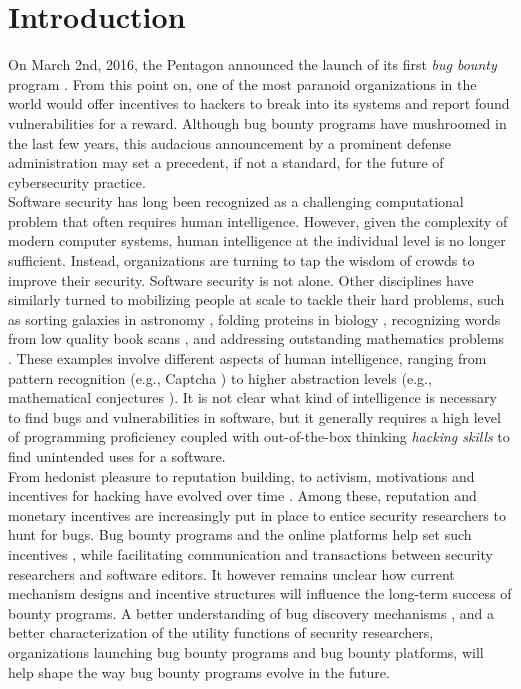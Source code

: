 \section{Introduction}
\label{sec:intro}
On March 2nd, 2016, the Pentagon announced the launch of its first {\it bug bounty} program \cite{Pentagon}. From this point on, one of the most paranoid organizations in the world would offer incentives to hackers to break into its systems and report found vulnerabilities for a reward. Although bug bounty programs have mushroomed in the last few years, this audacious announcement by a prominent defense administration may set a precedent, if not a standard, for the future of cybersecurity practice.\\ 

Software security has long been recognized as a challenging computational problem \cite{adams1984textordfeminineoptimizing} that often requires human intelligence. However, given the complexity of modern computer systems, human intelligence at the individual level is no longer sufficient. Instead, organizations are turning to tap the wisdom of crowds \cite{surowiecki2005wisdom} to improve their security. Software security is not alone. Other disciplines have similarly turned to mobilizing people at scale to tackle their hard problems, such as sorting galaxies in astronomy \cite{smith2013introduction}, folding proteins in biology \cite{khatib2011algorithm}, recognizing words from low quality book scans \cite{von2003captcha}, and addressing outstanding mathematics problems \cite{gowers2009massively,cranshaw2011polymath}. These examples involve different aspects of human intelligence, ranging from pattern recognition (e.g., Captcha \cite{von2003captcha}) to higher abstraction levels (e.g., mathematical conjectures \cite{gowers2009massively,cranshaw2011polymath}). It is not clear what kind of intelligence is necessary to find bugs and vulnerabilities in software, but it generally requires a high level of programming proficiency coupled with out-of-the-box thinking {\it hacking skills} to find unintended uses for a software. \\

From hedonist pleasure to reputation building, to activism, motivations and incentives for hacking have evolved over time \cite{Levy84}. Among these, reputation and monetary incentives are increasingly put in place to entice security researchers to hunt for bugs. Bug bounty programs and the online platforms help set such incentives \cite{bohme2006comparison,finifter2013empirical,zhao2014exploratory,zhao2015empirical}, while facilitating communication and transactions between security researchers and software editors. It however remains unclear how current mechanism designs and incentive structures will influence the long-term success of bounty programs. A better understanding of bug discovery mechanisms \cite{bishop1996conservative,brady1999murphy,zhao2016empirical}, and a better characterization of the utility functions of security researchers, organizations launching bug bounty programs and bug bounty platforms, will help shape the way bug bounty programs evolve in the  future.\\

